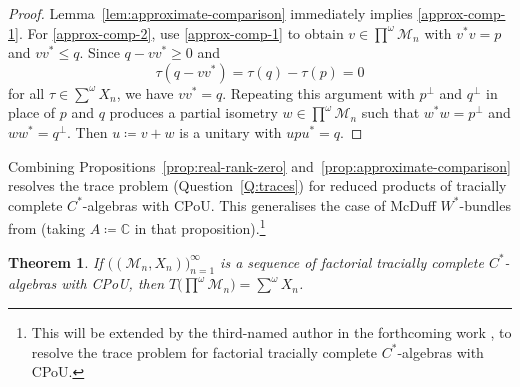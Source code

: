 \documentclass[a4paper,11pt]{amsart}
\newtheorem{theorem}{Theorem}
\theoremstyle{definition}
\numberwithin{equation}{section}
\numberwithin{theorem}{section}
\newcommand{\M}{\mathcal{M}}
\begin{document}
\begin{proof}
	Lemma~\ref{lem:approximate-comparison} immediately implies \ref{approx-comp-1}.  For \ref{approx-comp-2}, use \ref{approx-comp-1} to obtain $v \in \prod^\omega \M_n$ with $v^*v = p$ and $vv^* \leq q$.  Since $q - vv^* \geq 0$ and
	\begin{equation}
		\tau(q - vv^*) = \tau(q) - \tau(p) = 0
	\end{equation}
	for all $\tau \in \sum^\omega X_n$, we have $vv^* = q$.  Repeating this argument with $p^\perp$ and $q^\perp$ in place of $p$ and $q$ produces a partial isometry $w \in \prod^\omega \M_n$ such that $w^*w = p^\perp$ and $ww^* = q^\perp$.  Then $u \coloneqq v + w$ is a unitary with $upu^* = q$.
\end{proof}

Combining Propositions~\ref{prop:real-rank-zero} and~\ref{prop:approximate-comparison} resolves the trace problem (Question~\ref{Q:traces}) for reduced products of tracially complete $C^*$-algebras with CPoU. This generalises the case of McDuff $W^*$-bundles from \cite[Proposition 3.32]{BBSTWW} (taking $A\coloneqq\mathbb C$ in that proposition).\footnote{This will be extended by the third-named author in the forthcoming work \cite{Ev24}, to resolve the trace problem for factorial tracially complete $C^*$-algebras with CPoU.}

\begin{theorem}\label{thm:no-silly-traces}
	If $\big((\M_n, X_n)\big)_{n=1}^\infty$ is a sequence of factorial tracially complete $C^*$-algebras with CPoU, then $T\big(\prod^\omega \M_n) = \sum^\omega X_n$.
\end{theorem}
\end{document}
